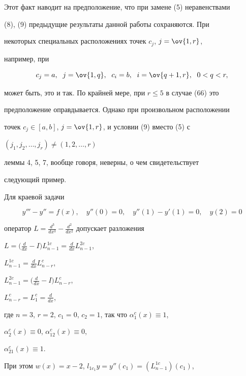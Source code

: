 Этот факт наводит на предположение, что при замене (5) неравенствами 


(8), (9) предыдущие результаты данной работы сохраняются. При 


некоторых специальных расположениях точек $c_j$, $j=\ov{1,r}$, 


например, при 


\begin{equation} 


c_j=a,\ \; j=\ov{1,q},\ \; c_i=b,\ \; i=\ov{q+1,r}, 


\ \; 0<q<r, 


\end{equation} 


может быть, это и так. По крайней мере, при $r\le 5$ в случае (66) это 


предположение оправдывается. Однако при произвольном расположении 


точек $c_j\in[a,b]$, $j=\ov{1,r}$, и условии (9) вместо (5) с 


$(j_1,j_2,\dotsc,j_r)\ne(1,2,\dotsc,r)$ 


леммы 4, 5, 7, вообще говоря, неверны, о чем свидетельствует 


следующий пример. 


 


Для краевой задачи 


\begin{equation} 


y'''-y''=f(x),\quad y''(0)=0,\quad 


y''(1)-y'(1)=0,\quad y(2)=0 


\end{equation} 


оператор $L=\frac{d^3}{dx^3}-\frac{d^2}{dx^2}$ допускает разложения 


$L=\Big(\frac{d}{dx}-I\Big)L^{1c}_{n-1}=\frac{d}{dx}L^{2c}_{n-1}$, 


$L^{1c}_{n-1}=\frac{d}{dx}L^c_{n-r}$, 


$L^{2c}_{n-1}=\Big(\frac{d}{dx}-I\Big)L^c_{n-r}$, 


$L^c_{n-r}=L^c_1=\frac{d}{dx}$, 


где $n=3$, $r=2$, $c_1=0$, $c_2=1$, так что $\alpha^c_1(x)\equiv1$, 


$\alpha^c_2(x)\equiv0$, $\alpha^c_{12}(x)\equiv0$, 


$\alpha^c_{21}(x)\equiv1$. 


При этом $w(x)=x-2$, $l_{1c_1}y=y''(c_1)=(L^{1c}_{n-1})(c_1)$, 


